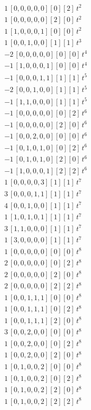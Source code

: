 \begin{align*}
1\,[0,0,0,0,0] [0] [2]\,t^{2} \\
1\,[0,0,0,0,0] [2] [0]\,t^{2} \\
1\,[1,0,0,0,1] [0] [0]\,t^{2} \\
1\,[0,0,1,0,0] [1] [1]\,t^{3} \\
-2\,[0,0,0,0,0] [0] [0]\,t^{4} \\
-1\,[1,0,0,0,1] [0] [0]\,t^{4} \\
-1\,[0,0,0,1,1] [1] [1]\,t^{5} \\
-2\,[0,0,1,0,0] [1] [1]\,t^{5} \\
-1\,[1,1,0,0,0] [1] [1]\,t^{5} \\
-1\,[0,0,0,0,0] [0] [2]\,t^{6} \\
-1\,[0,0,0,0,0] [2] [0]\,t^{6} \\
-1\,[0,0,2,0,0] [0] [0]\,t^{6} \\
-1\,[0,1,0,1,0] [0] [2]\,t^{6} \\
-1\,[0,1,0,1,0] [2] [0]\,t^{6} \\
-1\,[1,0,0,0,1] [2] [2]\,t^{6} \\
1\,[0,0,0,0,3] [1] [1]\,t^{7} \\
3\,[0,0,0,1,1] [1] [1]\,t^{7} \\
4\,[0,0,1,0,0] [1] [1]\,t^{7} \\
1\,[1,0,1,0,1] [1] [1]\,t^{7} \\
3\,[1,1,0,0,0] [1] [1]\,t^{7} \\
1\,[3,0,0,0,0] [1] [1]\,t^{7} \\
1\,[0,0,0,0,0] [0] [0]\,t^{8} \\
2\,[0,0,0,0,0] [0] [2]\,t^{8} \\
2\,[0,0,0,0,0] [2] [0]\,t^{8} \\
2\,[0,0,0,0,0] [2] [2]\,t^{8} \\
1\,[0,0,1,1,1] [0] [0]\,t^{8} \\
1\,[0,0,1,1,1] [0] [2]\,t^{8} \\
1\,[0,0,1,1,1] [2] [0]\,t^{8} \\
3\,[0,0,2,0,0] [0] [0]\,t^{8} \\
1\,[0,0,2,0,0] [0] [2]\,t^{8} \\
1\,[0,0,2,0,0] [2] [0]\,t^{8} \\
1\,[0,1,0,0,2] [0] [0]\,t^{8} \\
1\,[0,1,0,0,2] [0] [2]\,t^{8} \\
1\,[0,1,0,0,2] [2] [0]\,t^{8} \\
1\,[0,1,0,0,2] [2] [2]\,t^{8} \\

\end{align*}
